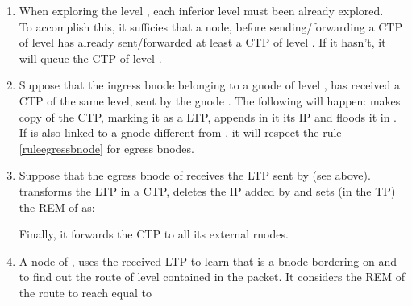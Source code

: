 \documentclass[a4paper]{article}
\begin{document}
\begin{enumerate}
	\item When exploring the level , each inferior level must been
		already explored.\\
		To accomplish this, it sufficies that a
		node, before sending/forwarding a CTP of level  has already
		sent/forwarded at least a CTP of level . If it hasn't, it will
		queue the CTP of level .
	\item Suppose that the ingress bnode  belonging to a gnode  of
		level , has received a CTP of the same level, sent by the
		gnode . The following
		will happen:  makes copy of the CTP, marking it as a LTP, appends in
		it its IP and floods it in . If  is also linked to a
		gnode different from , it will respect the rule
		\ref{ruleegressbnode} for egress bnodes. 
	\item \label{ruleegressbnode}
		Suppose that the egress bnode  of  receives the LTP
		sent by  (see above).  transforms the LTP in a CTP,
		deletes the IP added by  and sets (in the TP) the REM of 
		as:
		
		Finally, it forwards the CTP to all its external rnodes.
	\item A node  of , uses the received LTP to learn that  is a
		bnode bordering on  and to find out the route of level 
		contained in the packet. It considers the REM of the route to
		reach  equal to
		

\end{enumerate}
\end{document}
